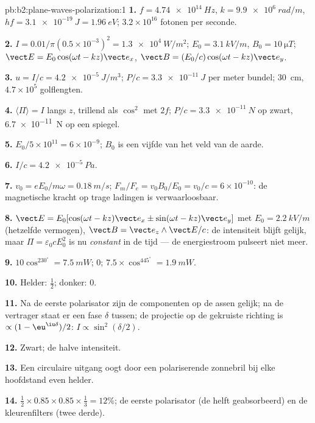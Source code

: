 \begin{solution}{pb:b2:plane-waves-polarization:1}
\textbf{1.} $f = \qty{4.74e14}{Hz}$, $k = \qty{9.9e6}{rad/m}$,
$hf = \qty{3.1e-19}{J} =
\qty{1.96}{eV}$; $3.2 \times 10^{16}$ fotonen per
seconde.

\textbf{2.} $I = 0.01/\pi(0.5 \times 10^{-3})^2 = \qty{1.3e4}{W/m^2}$;
$E_0 = \qty{3.1}{kV/m}$, $B_0 = \qty{10}{\micro T}$;
$\vect E = E_0\cos(\omega t - kz)\vect e_x$,
$\vect B = (E_0/c)\cos(\omega t
- kz)\vect e_y$.

\textbf{3.} $u = I/c = \qty{4.2e-5}{J/m^3}$; $P/c = \qty{3.3e-11}{J}$ per
meter bundel; \qty{30}{cm}, $4.7 \times 10^5$ golflengten.

\textbf{4.} $\langle\Pi\rangle = I$ langs $z$, trillend als $\cos^2$ met
$2f$; $P/c = \qty{3.3e-11}{N}$ op zwart, \qty{6.7e-11}{N} op een spiegel.

\textbf{5.} $E_0/5 \times 10^{11} = 6 \times 10^{-9}$; $B_0$ is een vijfde
van het veld van de aarde.

\textbf{6.} $I/c = \qty{4.2e-5}{Pa}$.

\textbf{7.} $v_0 = eE_0/m\omega = \qty{0.18}{m/s}$;
$F_m/F_e = v_0B_0/E_0 = v_0/c = 6 \times
10^{-10}$: de magnetische kracht op
trage ladingen is verwaarloosbaar.

\textbf{8.}
$\vect E = E_0[\cos(\omega t - kz)\vect e_x \pm \sin(\omega t - kz)\vect e_y]$
met $E_0 = \qty{2.2}{kV/m}$ (hetzelfde vermogen),
$\vect B = \vect e_z\wedge\vect E/c$: de intensiteit blijft gelijk, maar
$\Pi = \varepsilon_0cE_0^2$ is nu \emph{constant} in de tijd --- de
energiestroom pulseert niet meer.

\textbf{9.} $10\cos^230^\circ = \qty{7.5}{mW}$; $0$;
$7.5 \times \cos^445^\circ = \qty{1.9}{mW}$.

\textbf{10.} Helder: $\tfrac12$; donker: $0$.

\textbf{11.} Na de eerste polarisator zijn de componenten op de assen
gelijk; na de vertrager staat er een fase $\delta$ tussen; de projectie op
de gekruiste richting is $\propto(1 - \eu^{\iu\delta})/2$:
$I \propto \sin^2(\delta/2)$.

\textbf{12.} Zwart; de halve intensiteit.

\textbf{13.} Een circulaire uitgang oogt door een polariserende zonnebril
bij elke hoofdstand even helder.

\textbf{14.} $\tfrac12 \times 0.85 \times 0.85 \times \tfrac13 = 12\%$; de
eerste polarisator (de helft geabsorbeerd) en de kleurenfilters (twee
derde).


\end{solution}

